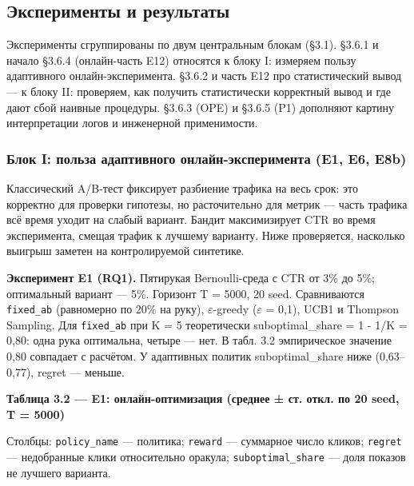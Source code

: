 \subsection{Эксперименты и результаты}\label{ux44dux43aux441ux43fux435ux440ux438ux43cux435ux43dux442ux44b-ux438-ux440ux435ux437ux443ux43bux44cux442ux430ux442ux44b}

Эксперименты сгруппированы по двум центральным блокам (§3.1). §3.6.1 и начало §3.6.4 (онлайн-часть E12) относятся к блоку I: измеряем пользу адаптивного онлайн-эксперимента. §3.6.2 и часть E12 про статистический вывод --- к блоку II: проверяем, как получить статистически корректный вывод и где дают сбой наивные процедуры. §3.6.3 (OPE) и §3.6.5 (P1) дополняют картину интерпретации логов и инженерной применимости.

\subsubsection{Блок I: польза адаптивного онлайн-эксперимента (E1, E6, E8b)}\label{ux431ux43bux43eux43a-i-ux43fux43eux43bux44cux437ux430-ux430ux434ux430ux43fux442ux438ux432ux43dux43eux433ux43e-ux43eux43dux43bux430ux439ux43d-ux44dux43aux441ux43fux435ux440ux438ux43cux435ux43dux442ux430-e1-e6-e8b}

Классический A/B-тест фиксирует разбиение трафика на весь срок: это корректно для проверки гипотезы, но расточительно для метрик --- часть трафика всё время уходит на слабый вариант. Бандит максимизирует CTR во время эксперимента, смещая трафик к лучшему варианту. Ниже проверяется, насколько выигрыш заметен на контролируемой синтетике.

\textbf{Эксперимент E1 (RQ1).} Пятирукая Bernoulli-среда с CTR от 3\% до 5\%; оптимальный вариант --- 5\%. Горизонт T = 5000, 20 seed. Сравниваются \texttt{fixed\_ab} (равномерно по 20\% на руку), $\varepsilon$-greedy ($\varepsilon$ = 0,1), UCB1 и Thompson Sampling. Для \texttt{fixed\_ab} при K = 5 теоретически suboptimal\_share = 1 - 1/K = 0,80: одна рука оптимальна, четыре --- нет. В табл. 3.2 эмпирическое значение 0,80 совпадает с расчётом. У адаптивных политик suboptimal\_share ниже (0,63--0,77), regret --- меньше.

\textbf{Таблица 3.2 --- E1: онлайн-оптимизация (среднее ± ст. откл. по 20 seed, T = 5000)}

Столбцы: \texttt{policy\_name} --- политика; \texttt{reward} --- суммарное число кликов; \texttt{regret} --- недобранные клики относительно оракула; \texttt{suboptimal\_share} --- доля показов не лучшего варианта.

